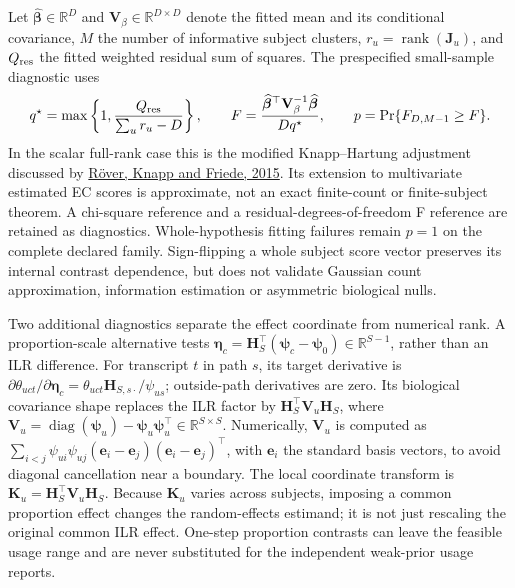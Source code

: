 \documentclass[11pt]{article}
\begin{document}
Let \(\widehat{\boldsymbol\beta}\in\mathbb R^D\) and \(\mathbf V_\beta\in\mathbb R^{D\times D}\) denote the fitted mean and its conditional covariance, \(M\) the number of informative subject clusters, \(r_u=\operatorname{rank}(\mathbf J_u)\), and \(Q_{\rm res}\) the fitted weighted residual sum of squares. The prespecified small-sample diagnostic uses \begin{equation}q^\star=\max\left\{1,\frac{Q_{\rm res}}{\sum_u r_u-D}\right\},\qquad F=\frac{\widehat{\boldsymbol\beta}^\top\mathbf V_\beta^{-1}\widehat{\boldsymbol\beta}}{Dq^\star},\qquad p=\Pr\{F_{D,M-1}\ge F\}.\end{equation} In the scalar full-rank case this is the modified Knapp--Hartung adjustment discussed by \href{https://doi.org/10.1186/s12874-015-0091-1}{R\"over, Knapp and Friede, 2015}. Its extension to multivariate estimated EC scores is approximate, not an exact finite-count or finite-subject theorem. A chi-square reference and a residual-degrees-of-freedom F reference are retained as diagnostics. Whole-hypothesis fitting failures remain \(p=1\) on the complete declared family. Sign-flipping a whole subject score vector preserves its internal contrast dependence, but does not validate Gaussian count approximation, information estimation or asymmetric biological nulls.

Two additional diagnostics separate the effect coordinate from numerical rank. A proportion-scale alternative tests \(\boldsymbol\eta_c=\mathbf H_S^\top(\boldsymbol\psi_c-\boldsymbol\psi_0)\in\mathbb R^{S-1}\), rather than an ILR difference. For transcript \(t\) in path \(s\), its target derivative is \(\partial\theta_{uct}/\partial\boldsymbol\eta_c=\theta_{uct}\mathbf H_{S,s\cdot}/\psi_{us}\); outside-path derivatives are zero. Its biological covariance shape replaces the ILR factor by \(\mathbf H_S^\top\mathbf V_u\mathbf H_S\), where \(\mathbf V_u=\operatorname{diag}(\boldsymbol\psi_u)-\boldsymbol\psi_u\boldsymbol\psi_u^\top\in\mathbb R^{S\times S}\). Numerically, \(\mathbf V_u\) is computed as \(\sum_{i<j}\psi_{ui}\psi_{uj}(\mathbf e_i-\mathbf e_j)(\mathbf e_i-\mathbf e_j)^\top\), with \(\mathbf e_i\) the standard basis vectors, to avoid diagonal cancellation near a boundary. The local coordinate transform is \(\mathbf K_u=\mathbf H_S^\top\mathbf V_u\mathbf H_S\). Because \(\mathbf K_u\) varies across subjects, imposing a common proportion effect changes the random-effects estimand; it is not just rescaling the original common ILR effect. One-step proportion contrasts can leave the feasible usage range and are never substituted for the independent weak-prior usage reports.
\end{document}

